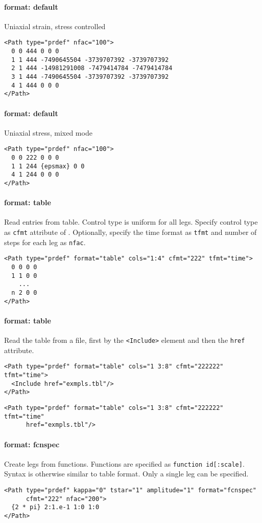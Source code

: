 \documentclass[11pt]{report}
\renewcommand{\tag}[1]{\texttt{<#1>}}
\newcommand{\reqdtag}[1]{\Red{\texttt{<#1>}}}
\begin{document}
\paragraph{format: default} Uniaxial strain, stress controlled
\begin{verbatim}
<Path type="prdef" nfac="100">
  0 0 444 0 0 0
  1 1 444 -7490645504 -3739707392 -3739707392
  2 1 444 -14981291008 -7479414784 -7479414784
  3 1 444 -7490645504 -3739707392 -3739707392
  4 1 444 0 0 0
</Path>
\end{verbatim}

\paragraph{format: default} Uniaxial stress, mixed mode
\begin{verbatim}
<Path type="prdef" nfac="100">
  0 0 222 0 0 0
  1 1 244 {epsmax} 0 0
  4 1 244 0 0 0
</Path>
\end{verbatim}

\paragraph{format: table} Read entries from table. Control type is uniform for
all legs. Specify control type as \texttt{cfmt} attribute of \reqdtag{Path}.
Optionally, specify the time format as \texttt{tfmt} and number of steps for
each leg as \texttt{nfac}.
\begin{verbatim}
<Path type="prdef" format="table" cols="1:4" cfmt="222" tfmt="time">
  0 0 0 0
  1 1 0 0
    ...
  n 2 0 0
</Path>
\end{verbatim}

\paragraph{format: table} Read the table from a file, first by the
\tag{Include} element and then the \texttt{href} attribute.
\begin{verbatim}
<Path type="prdef" format="table" cols="1 3:8" cfmt="222222" tfmt="time">
  <Include href="exmpls.tbl"/>
</Path>
\end{verbatim}

\begin{verbatim}
<Path type="prdef" format="table" cols="1 3:8" cfmt="222222" tfmt="time"
      href="exmpls.tbl"/>
\end{verbatim}

\paragraph{format: fcnspec} Create legs from functions. Functions are specified
as \texttt{function id[:scale]}.  Syntax is otherwise similar to table format.
Only a single leg can be specified.
\begin{verbatim}
<Path type="prdef" kappa="0" tstar="1" amplitude="1" format="fcnspec"
      cfmt="222" nfac="200">
  {2 * pi} 2:1.e-1 1:0 1:0
</Path>
\end{verbatim}
\end{document}
